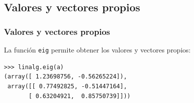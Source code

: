 \subsection{Valores y vectores propios}
\begin{frame}[fragile]
\frametitle{Valores y vectores propios}
La funci\'{o}n \texttt{eig} permite obtener los valores y vectores propios:
\begin{exampleblock}{}
\verb|>>> linalg.eig(a)| \\
\verb|(array([ 1.23698756, -0.56265224]),| \\
\verb| array([[ 0.77492825, -0.51447164],| \\
\verb|       [ 0.63204921,  0.85750739]]))|
\end{exampleblock}
\end{frame}

